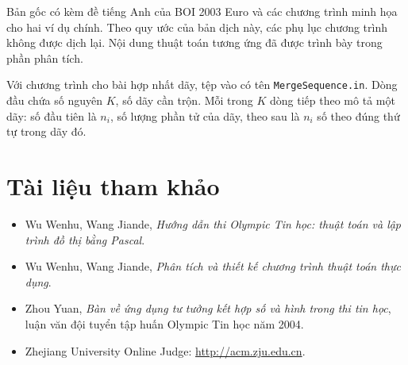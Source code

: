 \documentclass[11pt]{article}
\begin{document}
Bản gốc có kèm đề tiếng Anh của BOI 2003 Euro và các chương trình minh họa
cho hai ví dụ chính. Theo quy ước của bản dịch này, các phụ lục chương trình
không được dịch lại. Nội dung thuật toán tương ứng đã được trình bày trong
phần phân tích.

Với chương trình cho bài hợp nhất dãy, tệp vào có tên
\texttt{MergeSequence.in}. Dòng đầu chứa số nguyên $K$, số dãy cần trộn. Mỗi
trong $K$ dòng tiếp theo mô tả một dãy: số đầu tiên là $n_i$, số lượng phần tử
của dãy, theo sau là $n_i$ số theo đúng thứ tự trong dãy đó.

\section{Tài liệu tham khảo}

\begin{itemize}
  \item Wu Wenhu, Wang Jiande, \textit{Hướng dẫn thi Olympic Tin học: thuật
  toán và lập trình đồ thị bằng Pascal}.
  \item Wu Wenhu, Wang Jiande, \textit{Phân tích và thiết kế chương trình
  thuật toán thực dụng}.
  \item Zhou Yuan, \textit{Bàn về ứng dụng tư tưởng kết hợp số và hình trong
  thi tin học}, luận văn đội tuyển tập huấn Olympic Tin học năm 2004.
  \item Zhejiang University Online Judge: \url{http://acm.zju.edu.cn}.
\end{itemize}
\end{document}
